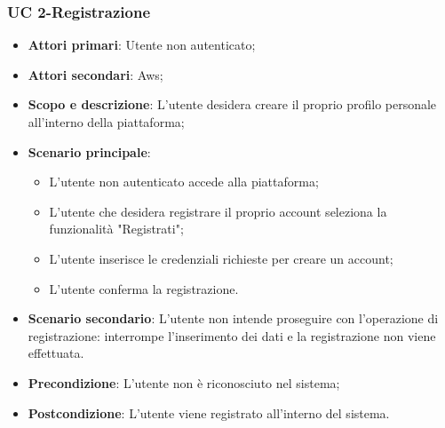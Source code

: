   

        \subsubsection{UC 2-Registrazione}
        \begin{itemize}
        \item \textbf{Attori primari}: Utente non autenticato;
        \item \textbf{Attori secondari}: Aws;
        \item \textbf{Scopo e descrizione}: L'utente desidera creare il proprio profilo personale all'interno della piattaforma; 
        \item \textbf{Scenario principale}:
            \begin{itemize}
                \item L'utente non autenticato accede alla piattaforma;
                \item L'utente che desidera registrare il proprio account seleziona la funzionalità "Registrati";
                \item L'utente inserisce le credenziali richieste per creare un account;
                \item L'utente conferma la registrazione.
            \end{itemize}
        \item \textbf{Scenario secondario}: L'utente non intende proseguire con l'operazione di registrazione: interrompe l'inserimento dei dati e la registrazione non viene effettuata.
        
        
        
        
        \item \textbf{Precondizione}: L'utente non è riconosciuto nel sistema;
        \item \textbf{Postcondizione}: L'utente viene registrato all'interno del sistema.
        \end{itemize}
        
        
